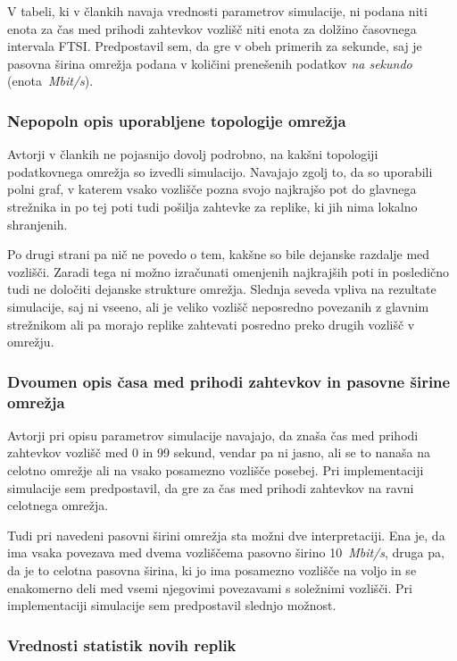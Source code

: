 \documentclass[a4paper, 12pt]{book}
\begin{document}
V tabeli, ki v člankih navaja vrednosti parametrov simulacije, ni podana
niti enota za čas med prihodi zahtevkov vozlišč niti enota za dolžino
časovnega intervala FTSI. Predpostavil sem, da gre v obeh primerih za sekunde,
saj je pasovna širina omrežja podana v količini prenešenih podatkov
\textit{na sekundo} (enota~\textit{Mbit/s}).

\subsubsection{Nepopoln opis uporabljene topologije omrežja}

Avtorji v člankih ne pojasnijo dovolj podrobno, na kakšni topologiji
podatkovnega omrežja so izvedli simulacijo. Navajajo zgolj to, da so uporabili
polni graf, v katerem vsako vozlišče pozna svojo najkrajšo pot do glavnega
strežnika in po tej poti tudi pošilja zahtevke za replike, ki jih nima lokalno
shranjenih.

Po drugi strani pa nič ne povedo o tem, kakšne so bile dejanske
razdalje med vozlišči. Zaradi tega ni možno izračunati omenjenih
najkrajših poti in posledično tudi ne določiti dejanske strukture omrežja.
Slednja seveda vpliva na rezultate simulacije, saj ni vseeno, ali je veliko
vozlišč neposredno povezanih z glavnim strežnikom ali pa morajo replike
zahtevati posredno preko drugih vozlišč v omrežju.

\subsubsection{Dvoumen opis časa med prihodi zahtevkov in pasovne širine
omrežja}

Avtorji pri opisu parametrov simulacije navajajo, da znaša čas med prihodi
zahtevkov vozlišč med 0 in 99 sekund, vendar pa ni jasno, ali se to nanaša
na celotno omrežje ali na vsako posamezno vozlišče posebej. Pri implementaciji
simulacije sem predpostavil, da gre za čas med prihodi zahtevkov na ravni
celotnega omrežja.

Tudi pri navedeni pasovni širini omrežja sta možni dve interpretaciji. Ena je,
da ima vsaka povezava med dvema vozliščema pasovno širino 10~\textit{Mbit/s},
druga pa, da je to celotna pasovna širina, ki jo ima posamezno vozlišče na
voljo in se enakomerno deli med vsemi njegovimi povezavami s soležnimi
vozlišči. Pri implementaciji simulacije sem predpostavil slednjo možnost.

\subsubsection{Vrednosti statistik novih replik}
\end{document}
